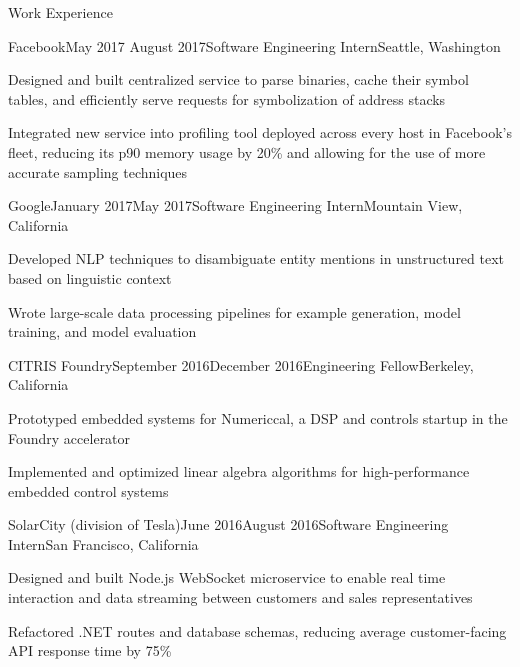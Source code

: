 \documentclass{resume} %
\begin{document}
\begin{rSection}{Work Experience}
\begin{rSubsection}{Facebook}{May 2017 \textminus August 2017}{Software Engineering Intern}{Seattle, Washington}
\item[] Designed and built centralized service to parse binaries, cache their symbol tables, and efficiently serve requests for symbolization of address stacks
\item[] Integrated new service into profiling tool deployed across every host in Facebook's fleet, reducing its p90 memory usage by 20\% and allowing for the use of more accurate sampling techniques
\end{rSubsection}
\begin{rSubsection}{Google}{January 2017\textminus May 2017}{Software Engineering Intern}{Mountain View, California}
\item[] Developed NLP techniques to disambiguate entity mentions in unstructured text based on linguistic context
\item[] Wrote large-scale data processing pipelines for example generation, model training, and model evaluation
\end{rSubsection}
\begin{rSubsection}{CITRIS Foundry}{September 2016\textminus December 2016}{Engineering Fellow}{Berkeley, California}
\item[] Prototyped embedded systems for Numericcal, a DSP and controls startup in the Foundry accelerator
\item[] Implemented and optimized linear algebra algorithms for high-performance embedded control systems
\end{rSubsection}
\begin{rSubsection}{SolarCity (division of Tesla)}{June 2016\textminus August 2016}{Software Engineering Intern}{San Francisco, California}
\item[] Designed and built Node.js WebSocket microservice to enable real time interaction and data streaming between customers and sales representatives
\item[] Refactored .NET routes and database schemas, reducing average customer-facing API response time by 75\%
\end{rSubsection}
\end{rSection}
\end{document}

